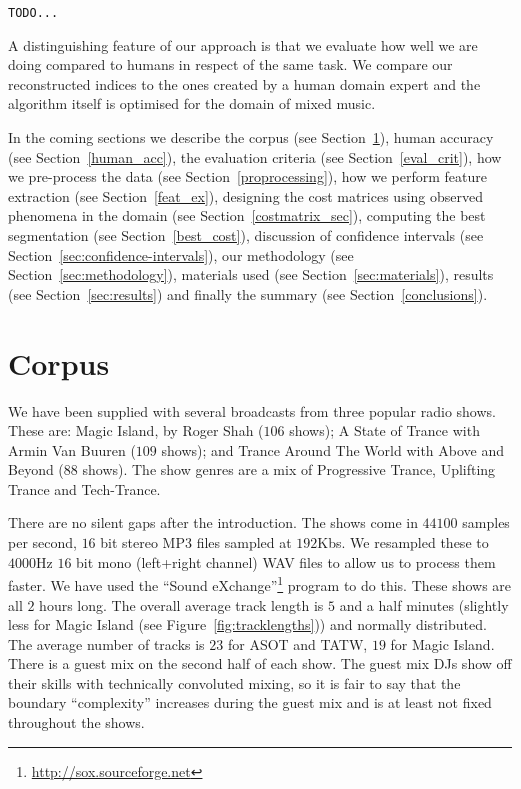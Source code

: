 \documentclass[twocolumn]{article}
\begin{document}
	 \texttt{TODO...}
	
	
	\citep{hauptmann1998story}
	
	A distinguishing feature of our approach is that we evaluate how well we are doing compared to humans in respect of the same task. We compare our reconstructed indices to the ones created by a human domain expert and the algorithm itself is optimised for the domain of mixed music. 
	
	
	In the coming sections we describe the corpus (see Section~\ref{dataset}), human accuracy (see Section~\ref{human_acc}),  the evaluation criteria (see Section~\ref{eval_crit}), how we pre-process the data (see Section~\ref{proprocessing}), how we perform feature extraction (see Section~\ref{feat_ex}), designing the cost matrices using observed phenomena in the domain (see Section~\ref{costmatrix_sec}), computing the best segmentation (see Section~\ref{best_cost}), discussion of confidence intervals (see Section~\ref{sec:confidence-intervals}), our methodology (see Section~\ref{sec:methodology}), materials used (see Section~\ref{sec:materials}), results (see Section~\ref{sec:results}) and finally the summary (see Section~\ref{conclusions}).
	
	\section{Corpus}\label{dataset}
	
	We have been supplied with several broadcasts from three popular radio shows. These are: Magic Island, by Roger Shah ($106$ shows); A State of Trance with Armin Van Buuren ($109$ shows); and Trance Around The World with Above and Beyond ($88$ shows). The show genres are a mix of Progressive Trance, Uplifting Trance and Tech-Trance. 
	
	There are no silent gaps after the introduction. 
	The shows come in $44100$ samples per second, $16$ bit stereo MP3 files sampled at $192$Kbs. We resampled these to $4000$Hz $16$ bit mono (left+right channel) WAV files to allow us to process them faster. We have used the ``Sound eXchange''\footnote{\url{http://sox.sourceforge.net}}  program to do this. These shows are all $2$ hours long. The overall average track length is $5$ and a half minutes (slightly less for Magic Island (see Figure~\ref{fig:tracklengths})) and normally distributed. The average number of tracks is $23$ for ASOT and TATW, $19$ for Magic Island. There is a guest mix on the second half of each show. The guest mix DJs show off their skills with technically convoluted mixing, so it is fair to say that the boundary ``complexity'' increases during the guest mix and is at least not fixed throughout the shows.
	
\end{document}
